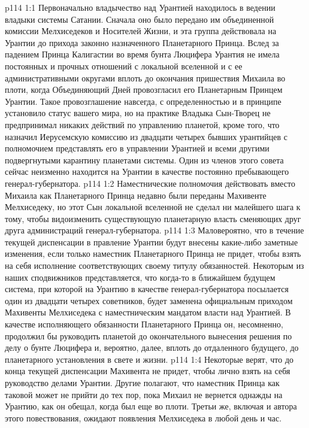 \vs p114 1:1 Первоначально владычество над Урантией находилось в ведении владыки системы Сатании. Сначала оно было передано им объединенной комиссии Мелхиседеков и Носителей Жизни, и эта группа действовала на Урантии до прихода законно назначенного Планетарного Принца. Вслед за падением Принца Калигастии во время бунта Люцифера Урантия не имела постоянных и прочных отношений с локальной вселенной и с ее административными округами вплоть до окончания пришествия Михаила во плоти, когда Объединяющий Дней провозгласил его Планетарным Принцем Урантии. Такое провозглашение навсегда, с определенностью и в принципе установило статус вашего мира, но на практике Владыка Сын\hyp{}Творец не предпринимал никаких действий по управлению планетой, кроме того, что назначил Иерусемскую комиссию из двадцати четырех бывших урантийцев с полномочием представлять его в управлении Урантией и всеми другими подвергнутыми карантину планетами системы. Один из членов этого совета сейчас неизменно находится на Урантии в качестве постоянно пребывающего генерал\hyp{}губернатора.
\vs p114 1:2 Наместнические полномочия действовать вместо Михаила как Планетарного Принца недавно были переданы Махивенте Мелхиседеку, но этот Сын локальной вселенной не сделал ни малейшего шага к тому, чтобы видоизменить существующую планетарную власть сменяющих друг друга администраций генерал\hyp{}губернатора.
\vs p114 1:3 Маловероятно, что в течение текущей диспенсации в правление Урантии будут внесены какие\hyp{}либо заметные изменения, если только наместник Планетарного Принца не придет, чтобы взять на себя исполнение соответствующих своему титулу обязанностей. Некоторым из наших сподвижников представляется, что когда\hyp{}то в ближайшем будущем система, при которой на Урантию в качестве генерал\hyp{}губернатора посылается один из двадцати четырех советников, будет заменена официальным приходом Махивенты Мелхиседека с наместническим мандатом власти над Урантией. В качестве исполняющего обязанности Планетарного Принца он, несомненно, продолжил бы руководить планетой до окончательного вынесения решения по делу о бунте Люцифера и, вероятно, далее, вплоть до отдаленного будущего, до планетарного установления в свете и жизни.
\vs p114 1:4 Некоторые верят, что до конца текущей диспенсации Махивента не придет, чтобы лично взять на себя руководство делами Урантии. Другие полагают, что наместник Принца как таковой может не прийти до тех пор, пока Михаил не вернется однажды на Урантию, как он обещал, когда был еще во плоти. Третьи же, включая и автора этого повествования, ожидают появления Мелхиседека в любой день и час.
